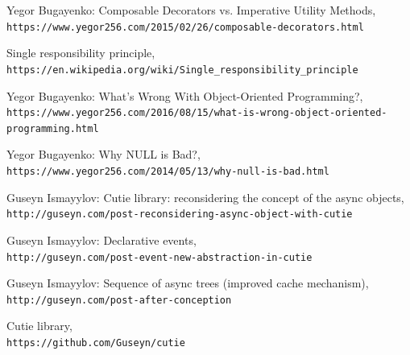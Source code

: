 \documentclass{article}
\begin{document}
\begin{thebibliography}{9}

Yegor Bugayenko: Composable Decorators vs. Imperative Utility Methods,
\\\texttt{https://www.yegor256.com/2015/02/26/composable-decorators.html}

Single responsibility principle,
\\\texttt{https://en.wikipedia.org/wiki/Single\_responsibility\_principle}

Yegor Bugayenko: What's Wrong With Object-Oriented Programming?,
\\\texttt{https://www.yegor256.com/2016/08/15/what-is-wrong-object-oriented-programming.html}

Yegor Bugayenko: Why NULL is Bad?,
\\\texttt{https://www.yegor256.com/2014/05/13/why-null-is-bad.html}

Guseyn Ismayylov: Cutie library: reconsidering the concept of the async objects,
\\\texttt{http://guseyn.com/post-reconsidering-async-object-with-cutie}

Guseyn Ismayylov: Declarative events,
\\\texttt{http://guseyn.com/post-event-new-abstraction-in-cutie}

Guseyn Ismayylov: Sequence of async trees (improved cache mechanism),
\\\texttt{http://guseyn.com/post-after-conception}

Cutie library,
\\\texttt{https://github.com/Guseyn/cutie}

\end{thebibliography}

\newpage

\tableofcontents
\end{document}
